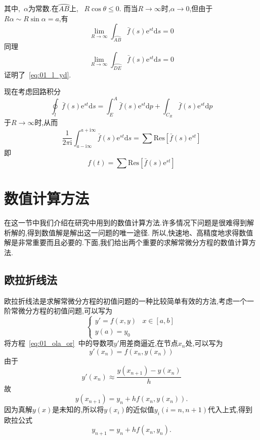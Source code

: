 \documentclass[a4paper,cs4size,adobefonts,fancyhdr]{ctexart}[2005/11/25]
\newcommand{\upcite}[1]{\textsuperscript{\textsuperscript{\cite{#1}}}}
\newcommand{\dif}{\mathrm{d}}
\newcommand*{\me}{\ensuremath{\mathrm{e}}}    %
\newcommand*{\mi}{\ensuremath{\mathrm{i}}}        %
\begin{document}
其中,~$\alpha$为常数.在$\wideparen{AB}$上,
~$R\cos\theta\leq0$.
而当$R\to\infty$时,$\alpha\to0$,但由于$R\alpha\sim
R\sin\alpha=a$,有
\begin{equation*}
\lim_{R\to\infty}\int_{\wideparen{AB}}\bar{f}(s)\me^{st}\dif s=0
\end{equation*}
同理
\begin{equation*}
\lim_{R\to\infty}\int_{\wideparen{DE}}\bar{f}(s)\me^{st}\dif s=0
\end{equation*}
证明了~\eqref{eq:01_l_yd}.\par
现在考虑回路积分
\begin{equation*}
\oint_l\bar{f}(s)\me^{st}\dif s=\int_E^A\bar{f}(s)\me^{st}\dif p+\int_{C_R}\bar{f}(s)\me^{st}\dif p
\end{equation*}
于$R\to\infty$时,从而
\begin{equation*}
 \dfrac{1}{2\pi\mi}\int_{a-\mi\infty}^{a+\mi\infty}\bar{f}(s)\me^{st}\dif s=
 \sum\mathrm{Res}[\bar{f}(s)\me^{st}]
\end{equation*}
即
\begin{equation}
 f(t)=\sum\mathrm{Res}[\bar{f}(s)\me^{st}]
\end{equation}
\section{数值计算方法}
在这一节中我们介绍在研究中用到的数值计算方法.许多情况下问题是很难得到解析解的,得到数值解是解出这一问题的唯一途径.
所以,快速地、高精度地求得数值解是非常重要而且必要的.下面,我们给出两个重要的求解常微分方程的数值计算方法.
\subsection{欧拉折线法}
欧拉折线法\upcite{2004}是求解常微分方程的初值问题的一种比较简单有效的方法,考虑一个一阶常微分方程的初值问题,可以写为
\begin{equation}\label{eq:01_ola_or}
 \begin{cases}
  y'=f(x,y)	&	x\in[a,b]	\\
  y(a)=y_0
 \end{cases}
\end{equation}
将方程~\eqref{eq:01_ola_or}~中的导数项$y'$用差商逼近,在节点$x_n$处,可以写为
\begin{equation}
 y'(x_n)=f(x_n,y(x_n))
\end{equation}
由于
\begin{equation*}
 y'(x_n)\approx\dfrac{y(x_{n+1})-y(x_n)}{h}
\end{equation*}
故
\begin{equation}
 y(x_{n+1})=y_n+hf(x_n,y(x_n)).
\end{equation}
因为真解$y(x)$是未知的,所以将$y(x_i)$的近似值$y_i(i=n,n+1)$代入上式,得到欧拉公式
\begin{equation}
 y_{n+1}=y_n+hf(x_n,y_n).
\end{equation}
\end{document}
